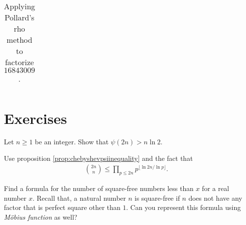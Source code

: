 \documentclass{subfiles}
\begin{document}
\begin{example}
\begin{table}
\begin{tabular}{|c|c|c|c|}
					\hline
				\end{tabular}
				\caption{Applying Pollard's rho method to factorize $16843009$.}
				\label{table:pollardmodified}
		\end{table}
	\end{example}

\newpage
\section{Exercises}

	\begin{problem}
		Let $n \geq 1$ be an integer. Show that $\psi(2n) >n \ln 2$.
	\end{problem}

	\begin{hint}
		Use proposition \eqref{prop:chebyshevpsiinequality} and the fact that
			\begin{align*}
				\binom{2n}{n} \leq \prod_{p \leq 2n} p^{\lfloor\ln 2n/\ln p\rfloor }.
			\end{align*}
	\end{hint}

	\begin{problem}
		Find a formula for the number of square-free numbers less than $x$ for a real number $x$. Recall that, a natural number $n$ is square-free if $n$ does not have any factor that is perfect square other than $1$. Can you represent this formula using \textit{M\" obius function} as well?
	\end{problem}
\end{document}
